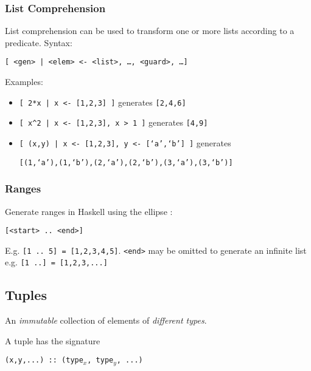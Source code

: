 \subsubsection{List Comprehension}
List comprehension can be used to transform one or more lists according to a predicate. Syntax:
\begin{center}
  \texttt{[ <gen> | <elem> <- <list>, \ldots, <guard>, \ldots ]}
\end{center}
Examples:
\begin{itemize}
  \item \texttt{[ 2*x | x <- [1,2,3] ]} generates \texttt{[2,4,6]}
  \item \texttt{[ x\^{}2 | x <- [1,2,3], x > 1 ]} generates \texttt{[4,9]}
  \item \texttt{[ (x,y) | x <- [1,2,3], y <- [`a',`b'] ]} generates
  
  \texttt{[(1,`a'),(1,`b'),(2,`a'),(2,`b'),(3,`a'),(3,`b')]}
\end{itemize}

\subsubsection{Ranges}
Generate ranges in Haskell using the ellipse :
\begin{center}
  \texttt{[<start> .. <end>]}
\end{center}

E.g. \texttt{[1 .. 5] = [1,2,3,4,5]}. \texttt{<end>} may be omitted to generate an infinite list e.g. \texttt{[1 ..] = [1,2,3,...]}

\subsection{Tuples}
An \textit{immutable} collection of elements of \textit{different types}.

A tuple has the signature
\begin{center}
  \texttt{(x,y,...) :: (type$_x$, type$_y$, ...)}
\end{center}